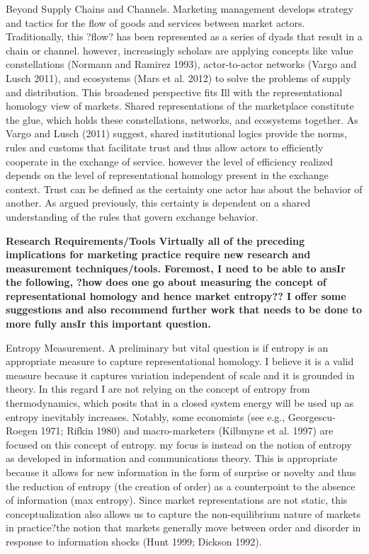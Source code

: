 Beyond Supply Chains and Channels. 
Marketing management develops strategy and tactics for the flow of goods and services between market actors. Traditionally, this ?flow? has been represented as a series of dyads that result in a chain or channel. however, increasingly scholars are applying concepts like value constellations (Normann and Ramirez 1993), actor-to-actor networks (Vargo and Lusch 2011), and ecosystems (Mars et al. 2012) to solve the problems of supply and distribution. This broadened perspective fits Ill with the representational homology view of markets. Shared representations of the marketplace constitute the glue, which holds these constellations, networks, and ecosystems together. As Vargo and Lusch (2011) suggest, shared institutional logics provide the norms, rules and customs that facilitate trust and thus allow actors to efficiently cooperate in the exchange of service. however the level of efficiency realized depends on the level of representational homology present in the exchange context. Trust can be defined as the certainty one actor has about the behavior of another. As argued previously, this certainty is dependent on a shared understanding of the rules that govern exchange behavior. 

\bf{Research Requirements/Tools }
Virtually all of the preceding implications for marketing practice require new research and measurement techniques/tools. Foremost, I need to be able to ansIr the following, ?how does one go about measuring the concept of representational homology and hence market entropy?? I offer some suggestions and also recommend further work that needs to be done to more fully ansIr this important question. 

Entropy Measurement. A preliminary but vital question is if entropy is an appropriate measure to capture representational homology. I believe it is a valid measure because it captures variation independent of scale and it is grounded in theory. In this regard I are not relying on the concept of entropy from thermodynamics, which posits that in a closed system energy will be used up as entropy inevitably increases. Notably, some economists (see e.g., Georgescu-Roegen 1971; Rifkin 1980) and macro-marketers (Kilbmyne et al. 1997) are focused on this concept of entropy. my focus is instead on the notion of entropy as developed in information and communications theory. This is appropriate because it allows for new information in the form of surprise or novelty and thus the reduction of entropy (the creation of order) as a counterpoint to the absence of information (max entropy). Since market representations are not static, this conceptualization also allows us to capture the non-equilibrium nature of markets in practice?the notion that markets generally move between order and disorder in response to information shocks (Hunt 1999; Dickson 1992). 

